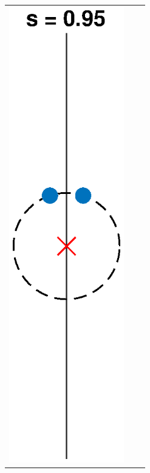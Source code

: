 \documentclass[thesis.tex]{subfiles}
\begin{document}
\begin{figure}
\begin{center}
\begin{tabular}{ccc}
\includegraphics[width=5cm]{images/kreinbubbles/bubble095R} &

\end{tabular}
\end{center}
\end{figure}
\end{document}
